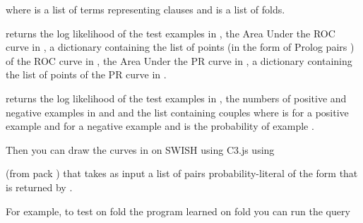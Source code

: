 \documentclass[letterpaper,10pt,english]{sphinxmanual}
\begin{document}
where  is a list of terms representing clauses and  is a list of folds.

 returns the log likelihood of the test examples in , the Area Under the ROC curve in , a dictionary containing the list of points (in the form of Prolog pairs ) of the ROC curve in , the Area Under the PR curve in , a dictionary containing the list of points of the PR curve in .

 returns the log likelihood of the test examples in , the numbers of positive and negative examples in  and  and the list  containing couples  where  is  for  a positive example and  for  a negative example and  is the probability of example .

Then you can draw the curves in  on SWISH using C3.js using

\begin{sphinxVerbatim}[commandchars=\\\{\}]
  
\end{sphinxVerbatim}

(from pack ) that takes as input a list  of pairs probability-literal of the form that is returned by .

For example, to test on fold  the program learned on fold  you can run the query
\end{document}
